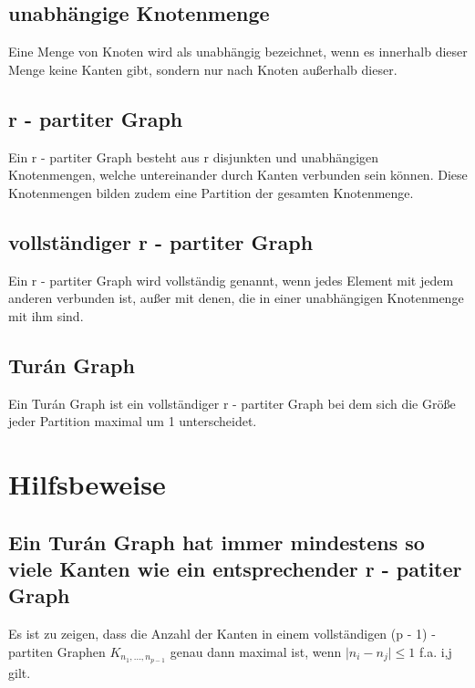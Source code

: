 \documentclass[12pt, a4paper]{article}
\begin{document}
\subsection{unabhängige Knotenmenge}
\label{theorem:unabhangige-knotenmenge}
Eine Menge von Knoten wird als unabhängig bezeichnet, wenn es innerhalb dieser Menge keine Kanten gibt, sondern nur nach Knoten außerhalb dieser.


\subsection{r - partiter Graph}
\label{theorem:r-partiter-graph}
Ein r - partiter Graph besteht aus r disjunkten und unabhängigen Knotenmengen, welche untereinander durch Kanten verbunden sein können. Diese Knotenmengen bilden zudem eine Partition der gesamten Knotenmenge.


\subsection{vollständiger r - partiter Graph}
\label{theorem:vollstandiger-r-partiter-graph}
Ein r - partiter Graph wird vollständig genannt, wenn jedes Element mit jedem anderen verbunden ist, außer mit denen, die in einer unabhängigen Knotenmenge mit ihm sind.


\subsection{Turán Graph}
\label{theorem:turan-graph}
Ein Turán Graph ist ein vollständiger r - partiter Graph bei dem sich die Größe jeder Partition maximal um 1 unterscheidet.


\section{Hilfsbeweise}
\label{theorem:hilfsbeweise}

\subsection{Ein Turán Graph hat immer mindestens so viele Kanten wie ein entsprechender r - patiter Graph}
\label{theorem:ein-turan-graph-hat-immer-mindestens-so-viele-kanten-wie-ein-entsprechender-r-patiter-graph}
Es ist zu zeigen, dass die Anzahl der Kanten in einem vollständigen (p - 1) - partiten Graphen $K_{n_1,...,n_{p - 1}}$ genau dann maximal ist, wenn $\mid n_i - n_j \mid \le 1$ f.a. i,j gilt.
\end{document}
